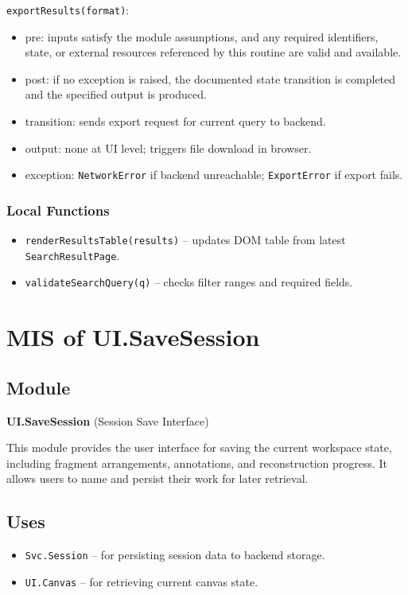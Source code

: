 \documentclass[12pt, titlepage]{article}
\begin{document}
\noindent \texttt{exportResults(format)}:
\begin{itemize}
    \item pre: inputs satisfy the module assumptions, and any required identifiers, state, or external resources referenced by this routine are valid and available.
    \item post: if no exception is raised, the documented state transition is completed and the specified output is produced.
    \item transition: sends export request for current query to backend.
    \item output: none at UI level; triggers file download in browser.
    \item exception: \texttt{NetworkError} if backend unreachable; \texttt{ExportError} if export fails.
\end{itemize}

\subsubsection{Local Functions}
\begin{itemize}
    \item \texttt{renderResultsTable(results)} – updates DOM table from latest \texttt{SearchResultPage}.
    \item \texttt{validateSearchQuery(q)} – checks filter ranges and required fields.
\end{itemize}



\section{MIS of UI.SaveSession} \label{UI.SaveSession}

\subsection{Module}
\textbf{UI.SaveSession} \; (Session Save Interface)

This module provides the user interface for saving the current workspace state, including fragment arrangements, annotations, and reconstruction progress. It allows users to name and persist their work for later retrieval.

\subsection{Uses}
\begin{itemize}
    \item \texttt{Svc.Session} – for persisting session data to backend storage.
    \item \texttt{UI.Canvas} – for retrieving current canvas state.
\end{itemize}
\end{document}
